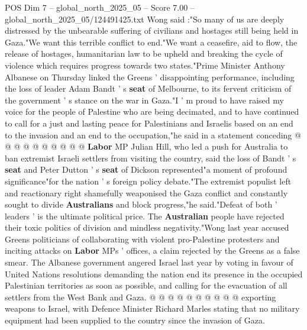 \begin{textsample}{POS Dim 7 – global\_north\_2025\_05 – Score 7.00 – global\_north\_2025\_05/124491425.txt}
Wong said :"So many of us are deeply distressed by the unbearable suffering of civilians and hostages still being held in Gaza."We want this terrible conflict to end."We want a ceasefire, aid to flow, the release of hostages, humanitarian law to be upheld and breaking the cycle of violence which requires progress towards two states."Prime Minister Anthony Albanese on Thursday linked the Greens ' disappointing performance, including the loss of leader Adam Bandt ' s \textbf{seat} of Melbourne, to its fervent criticism of the government ' s stance on the war in Gaza."I ' m proud to have raised my voice for the people of Palestine who are being decimated, and to have continued to call for a just and lasting peace for Palestinians and Israelis based on an end to the invasion and an end to the occupation,"he said in a statement conceding @ @ @ @ @ @ @ @ @ @ \textbf{Labor} MP Julian Hill, who led a push for Australia to ban extremist Israeli settlers from visiting the country, said the loss of Bandt ' s \textbf{seat} and Peter Dutton ' s \textbf{seat} of Dickson represented"a moment of profound significance"for the nation ' s foreign policy debate."The extremist populist left and reactionary right shamefully weaponised the Gaza conflict and constantly sought to divide \textbf{Australians} and block progress,"he said."Defeat of both ' leaders ' is the ultimate political price.
The \textbf{Australian} people have rejected their toxic politics of division and mindless negativity."Wong last year accused Greens politicians of collaborating with violent pro-Palestine protesters and inciting attacks on \textbf{Labor} MPs ' offices, a claim rejected by the Greens as a false smear.
The Albanese government angered Israel last year by voting in favour of United Nations resolutions demanding the nation end its presence in the occupied Palestinian territories as soon as possible, and calling for the evacuation of all settlers from the West Bank and Gaza. @ @ @ @ @ @ @ @ @ @ exporting weapons to Israel, with Defence Minister Richard Marles stating that no military equipment had been supplied to the country since the invasion of Gaza.

\end{textsample}
